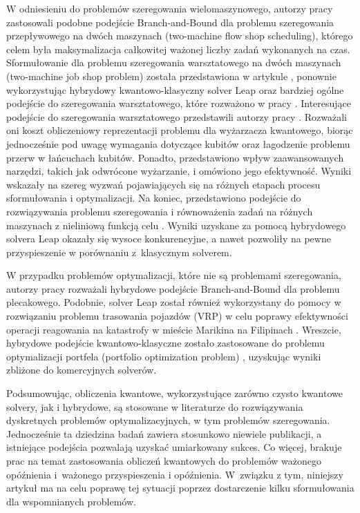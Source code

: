W odniesieniu do problemów szeregowania wielomaszynowego, autorzy pracy \cite{10382117} zastosowali podobne podejście Branch-and-Bound dla problemu szeregowania przepływowego na dwóch maszynach (two-machine flow shop scheduling), którego celem była maksymalizacja całkowitej ważonej liczby zadań wykonanych na czas. Sformułowanie dla problemu szeregowania warsztatowego na dwóch maszynach (two-machine job shop problem) została przedstawiona w artykule \cite{10.1007/978-3-031-75013-7_7}, ponownie wykorzystując hybrydowy kwantowo-klasyczny solver Leap oraz bardziej ogólne podejście do szeregowania warsztatowego, które rozważono w pracy \cite{venturelli2016job}.
Interesujące podejście do szeregowania warsztatowego przedstawili autorzy pracy \cite{carugno2022evaluating}. Rozważali oni koszt obliczeniowy reprezentacji problemu dla wyżarzacza kwantowego, biorąc jednocześnie pod uwagę wymagania dotyczące kubitów oraz łagodzenie problemu przerw w łańcuchach kubitów. Ponadto, przedstawiono wpływ zaawansowanych narzędzi, takich jak odwrócone wyżarzanie, i omówiono jego efektywność. Wyniki wskazały na szereg wyzwań pojawiających się na różnych etapach procesu sformułowania i optymalizacji. Na koniec, przedstawiono podejście do rozwiązywania problemu szeregowania i równoważenia zadań na różnych maszynach z nieliniową funkcją celu \cite{10821238}. Wyniki uzyskane za pomocą hybrydowego solvera Leap okazały się wysoce konkurencyjne, a nawet pozwoliły na pewne przyspieszenie w porównaniu z~klasycznym solverem.

W przypadku problemów optymalizacji, które nie są problemami szeregowania, autorzy pracy \cite{bozejko2024optimal} rozważali hybrydowe podejście Branch-and-Bound dla problemu plecakowego. Podobnie, solver Leap został również wykorzystany do pomocy w rozwiązaniu problemu trasowania pojazdów (VRP) w celu poprawy efektywności operacji reagowania na katastrofy w mieście Marikina na Filipinach \cite{Cadelina}. Wreszcie, hybrydowe podejście kwantowo-klasyczne zostało zastosowane do problemu optymalizacji portfela (portfolio optimization problem) \cite{10.1007/978-3-030-77980-1_4}, uzyskując wyniki zbliżone do komercyjnych solverów.


Podsumowując, obliczenia kwantowe, wykorzystujące zarówno czysto kwantowe solvery, jak i hybrydowe, są stosowane w literaturze do rozwiązywania dyskretnych problemów optymalizacyjnych, w tym problemów szeregowania. Jednocześnie ta dziedzina badań zawiera stosunkowo niewiele publikacji, a istniejące podejścia pozwalają uzyskać umiarkowany sukces. Co więcej, brakuje prac na temat zastosowania obliczeń kwantowych do problemów ważonego opóźnienia i~ważonego przyspieszenia i opóźnienia. W~związku z tym, niniejszy artykuł ma na celu poprawę tej sytuacji poprzez dostarczenie kilku sformułowania dla wspomnianych problemów.

